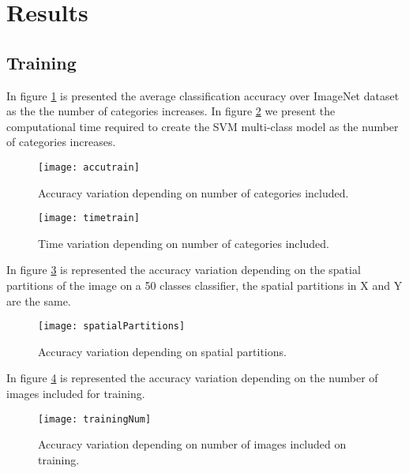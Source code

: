 \documentclass[10pt,twocolumn,letterpaper]{article}
\begin{document}
\section{Results}
\subsection{Training}
In figure \ref{traininacc} is presented the average classification accuracy over ImageNet dataset as the the number of categories increases.
In figure \ref{trainintime} we present the computational time required to create the SVM multi-class model as the number of categories increases.
\begin{figure}[h]
\centering
\texttt{[image: accutrain]}
\caption{Accuracy variation depending on number of categories included.}
\label{traininacc}
\centering
\end{figure}

\begin{figure}[h]
\centering
\texttt{[image: timetrain]}
\caption{Time variation depending on number of categories included.}
\label{trainintime}
\centering
\end{figure}

In figure \ref{spatialparts} is represented the accuracy variation depending on the spatial partitions of the image on a 50 classes classifier, the spatial partitions in X and Y are the same.

\begin{figure}[h]
\centering
\texttt{[image: spatialPartitions]}
\caption{Accuracy variation depending on spatial partitions.}
\label{spatialparts}
\centering
\end{figure}

In figure \ref{trainnum} is represented the accuracy variation depending on the number of images included for training. 

\begin{figure}[h]
\centering
\texttt{[image: trainingNum]}
\caption{Accuracy variation depending on number of images included on training.}
\label{trainnum}
\centering
\end{figure}
\end{document}
